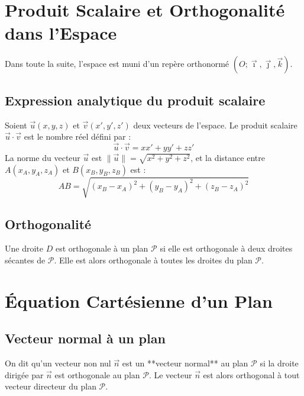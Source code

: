 \section{Produit Scalaire et Orthogonalité dans l'Espace}

Dans toute la suite, l'espace est muni d'un repère orthonormé $(O; \vec{\imath}, \vec{\jmath}, \vec{k})$.

\subsection{Expression analytique du produit scalaire}

\begin{definition}
Soient $\vec{u}(x, y, z)$ et $\vec{v}(x', y', z')$ deux vecteurs de l'espace. Le produit scalaire $\vec{u} \cdot \vec{v}$ est le nombre réel défini par :
\[
\vec{u} \cdot \vec{v} = x x' + y y' + z z'
\]
La norme du vecteur $\vec{u}$ est $\|\vec{u}\| = \sqrt{x^2+y^2+z^2}$, et la distance entre $A(x_A, y_A, z_A)$ et $B(x_B, y_B, z_B)$ est :
\[
AB = \sqrt{(x_B-x_A)^2 + (y_B-y_A)^2 + (z_B-z_A)^2}
\]
\end{definition}

\subsection{Orthogonalité}

\begin{definition}
Une droite $D$ est orthogonale à un plan $\mathcal{P}$ si elle est orthogonale à deux droites sécantes de $\mathcal{P}$.
Elle est alors orthogonale à toutes les droites du plan $\mathcal{P}$.
\end{definition}

\section{Équation Cartésienne d'un Plan}

\subsection{Vecteur normal à un plan}

\begin{definition}
On dit qu'un vecteur non nul $\vec{n}$ est un **vecteur normal** au plan $\mathcal{P}$ si la droite dirigée par $\vec{n}$ est orthogonale au plan $\mathcal{P}$. Le vecteur $\vec{n}$ est alors orthogonal à tout vecteur directeur du plan $\mathcal{P}$.
\end{definition}

